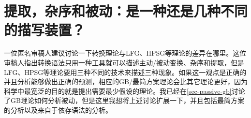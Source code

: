 \chapter{提取，杂序和被动：是一种还是几种不同的描写装置？}
\label{chap-scrambling-extraction-passive}

一位匿名审稿人建议讨论一下转换理论与LFG、HPSG等理论的差异在哪里。这位审稿人指出转换语法只用一种工具就可以描述主动/被动变换、杂序和提取，但是LFG、HPSG等理论要用三种不同的技术来描述三种现象。如果这一观点是正确的并且分析能够做出正确的预测，相应的GB/最简方案理论会比其它理论更好，因为科学中最宽泛的目的就是提出需要最少假设的理论。我已经在\ref{sec-passive-gb}讨论了GB理论如何分析被动，但是这里我想将上述讨论扩展一下，并且包括最简方案的分析以及来自于依存语法的分析。

